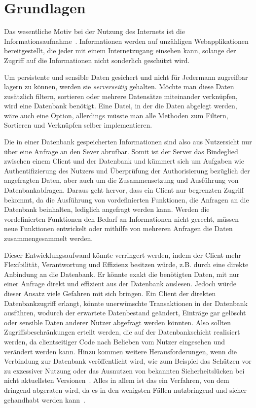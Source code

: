 
\chapter{Grundlagen}
\label{sec:basics}
Das wesentliche Motiv bei der Nutzung des Internets ist die In\-for\-ma\-tions\-auf\-nah\-me~\cite{statista-1}\cite{ard-zdf}.
Informationen werden auf unzähligen Webapplikationen bereitgestellt, die jeder mit einem Internetzugang einsehen kann,
solange der Zugriff auf die Informationen nicht sonderlich geschützt wird.

Um persistente und sensible Daten gesichert und nicht für Jedermann zugreifbar lagern zu können, werden sie \emph{serverseitig} gehalten.
Möchte man diese Daten zusätzlich filtern, sortieren oder mehrere Datensätze miteinander verknüpfen, wird eine Datenbank benötigt.
Eine Datei, in der die Daten abgelegt werden, wäre auch eine Option, allerdings müsste man alle Methoden zum Filtern, Sortieren und Verknüpfen
selber implementieren.

Die in einer Datenbank gespeicherten Informationen sind also aus Nutzersicht nur über eine Anfrage an den Sever abrufbar.
Somit ist der Server das Bindeglied zwischen einem Client und der Datenbank und kümmert sich um Aufgaben wie Authentifizierung des Nutzers
und Überprüfung der Authorisierung bezüglich der angefragten Daten, aber auch um die Zusammensetzung und Ausführung von Datenbankabfragen.
Daraus geht hervor, dass ein Client nur begrenzten Zugriff bekommt, da die Ausführung von vordefinierten Funktionen, die Anfragen an die Datenbank beinhalten,
lediglich angefragt werden kann. Werden die vordefinierten Funktionen den Bedarf an Informationen nicht gerecht, müssen neue Funktionen entwickelt
oder mithilfe von mehreren Anfragen die Daten zusammengesammelt werden.

Dieser Entwicklungsaufwand könnte verringert werden, indem der Client mehr Flexibilität, Verantwortung und Effizienz besitzen würde,
z.B. durch eine direkte Anbindung an die Datenbank.
Er könnte exakt die benötigten Daten, mit nur einer Anfrage direkt und effizient aus der Datenbank auslesen.
Jedoch würde dieser Ansatz viele Gefahren mit sich bringen. Ein Client der direkten Datenbankzugriff erlangt,
könnte unerwünschte Transaktionen in der Datenbank ausführen, wodurch der erwartete Datenbestand geändert,
Einträge gar gelöscht oder sensible Daten anderer Nutzer abgefragt werden könnten. Also sollten Zugriffsbeschränkungen erteilt werden, die
auf der Datenbankschicht realisiert werden, da clientseitiger Code nach Belieben vom Nutzer eingesehen und verändert werden kann.
Hinzu kommen weitere Herausforderungen, wenn die Verbindung zur Datenbank veröffentlicht wird,
wie zum Beispiel das Schützen vor zu exzessiver Nutzung oder das Ausnutzen von bekannten Sicherheitslücken bei nicht aktuellsten Versionen~\cite{postgresql-security}.
Alles in allem ist das ein Verfahren, von dem dringend abgeraten wird, da es in den wenigsten Fällen nutzbringend und sicher gehandhabt werden kann~\cite{client-to-database}.

